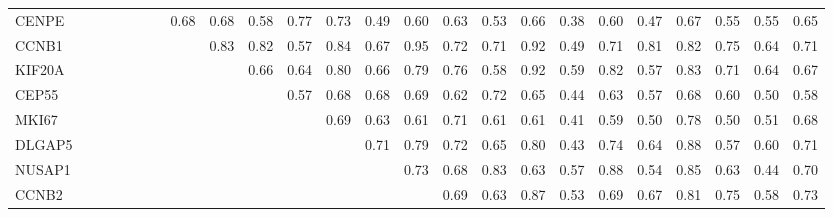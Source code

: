 \begin{longtable}{lrrrrrrrrrrrrrrrrrrrrrrr}
CENPE  &              &            &             &             &            &             &        0.68 &         0.68 &        0.58 &        0.77 &         0.73 &         0.49 &        0.60 &        0.63 &       0.53 &       0.66 &        0.38 &        0.60 &        0.47 &       0.67 &        0.55 &        0.55 &        0.65 \\
CCNB1  &              &            &             &             &            &             &             &         0.83 &        0.82 &        0.57 &         0.84 &         0.67 &        0.95 &        0.72 &       0.71 &       0.92 &        0.49 &        0.71 &        0.81 &       0.82 &        0.75 &        0.64 &        0.71 \\
KIF20A &              &            &             &             &            &             &             &              &        0.66 &        0.64 &         0.80 &         0.66 &        0.79 &        0.76 &       0.58 &       0.92 &        0.59 &        0.82 &        0.57 &       0.83 &        0.71 &        0.64 &        0.67 \\
CEP55  &              &            &             &             &            &             &             &              &             &        0.57 &         0.68 &         0.68 &        0.69 &        0.62 &       0.72 &       0.65 &        0.44 &        0.63 &        0.57 &       0.68 &        0.60 &        0.50 &        0.58 \\
MKI67  &              &            &             &             &            &             &             &              &             &             &         0.69 &         0.63 &        0.61 &        0.71 &       0.61 &       0.61 &        0.41 &        0.59 &        0.50 &       0.78 &        0.50 &        0.51 &        0.68 \\
DLGAP5 &              &            &             &             &            &             &             &              &             &             &              &         0.71 &        0.79 &        0.72 &       0.65 &       0.80 &        0.43 &        0.74 &        0.64 &       0.88 &        0.57 &        0.60 &        0.71 \\
NUSAP1 &              &            &             &             &            &             &             &              &             &             &              &              &        0.73 &        0.68 &       0.83 &       0.63 &        0.57 &        0.88 &        0.54 &       0.85 &        0.63 &        0.44 &        0.70 \\
CCNB2  &              &            &             &             &            &             &             &              &             &             &              &              &             &        0.69 &       0.63 &       0.87 &        0.53 &        0.69 &        0.67 &       0.81 &        0.75 &        0.58 &        0.73 \\

\end{longtable}
